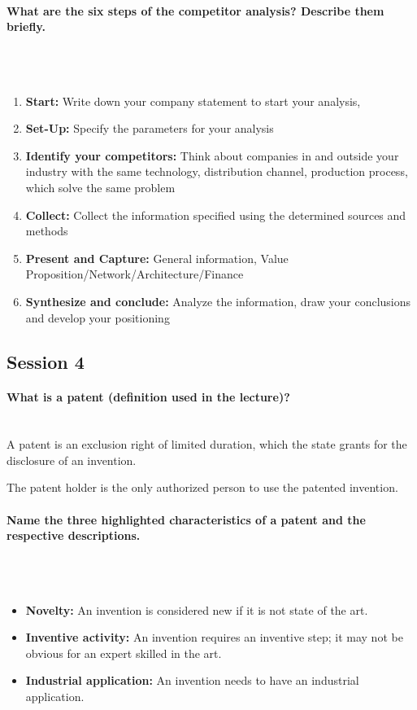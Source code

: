 \documentclass[10pt,a4paper,noendnumber=true]{scrartcl}
\newcommand{\properparagraph}[1]{\paragraph{\textcolor{Emerald}{#1}}\mbox{}\\}
\begin{document}
\properparagraph{What are the six steps of the competitor analysis? Describe them briefly.}
\\[-6ex]
\begin{enumerate}
	\item \textbf{Start:}
	Write down your company statement to start your analysis,
	\item \textbf{Set-Up:}
	Specify the parameters for your analysis
	\item \textbf{Identify your competitors:}
	Think about companies in and outside your industry with the same technology, distribution channel, production process, which solve the same problem
	\item \textbf{Collect:}
	Collect the information specified using the determined sources and methods
	\item \textbf{Present and Capture:}
	General information, Value Proposition/Network/Architecture/Finance
	\item \textbf{Synthesize and conclude:}
	 Analyze the information, draw your conclusions and develop your positioning
\end{enumerate}







\newpage
\subsection{Session 4}
\properparagraph{What is a patent (definition used in the lecture)?}
A patent is an exclusion right of limited duration, which the state grants for the disclosure of an invention.

The patent holder is the only authorized person to use the patented invention.

\properparagraph{Name the three highlighted characteristics of a patent and the respective descriptions.}
\\[-6ex]
\begin{itemize}
	\item \textbf{Novelty:} 
	An invention is considered new if it is not state of the art.
	
	\item \textbf{Inventive activity:} 
	An invention requires an inventive step; it may not be obvious for an expert skilled in the art.
	
	\item \textbf{Industrial application:} 
	An invention needs to have an industrial application.
\end{itemize}
\end{document}
